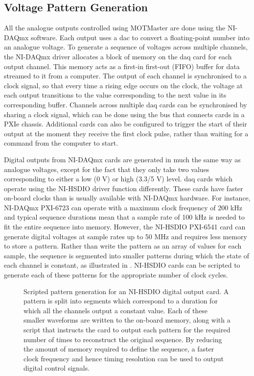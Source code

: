 \subsection{Voltage Pattern Generation}\label{subsec:compinterface_patterngen}
All the analogue outputs controlled using MOTMaster are done using the NI-DAQmx software. Each output uses a \ac{dac} to convert a floating-point number into an analogue voltage. To generate a sequence of voltages across multiple channels, the NI-DAQmx driver allocates a block of memory on the \ac{daq} card for each output channel. This memory acts as a first-in first-out (FIFO) buffer for data streamed to it from a computer. The output of each channel is synchronised to a clock signal, so that every time a rising edge occurs on the clock, the voltage at each output transitions to the value corresponding to the next value in its corresponding buffer. Channels across multiple \ac{daq} cards can be synchronised by sharing a clock signal, which can be done using the bus that connects cards in a PXIe chassis. Additional cards can also be configured to trigger the start of their output at the moment they receive the first clock pulse, rather than waiting for a command from the computer to start. \par\noindent 
Digital outputs from NI-DAQmx cards are generated in much the same way as analogue voltages, except for the fact that they only take two values corresponding to either a low (0 V) or high (3.3/5 V) level. \ac{daq} cards which operate using the NI-HSDIO driver function differently. These cards have faster on-board clocks than is usually available with NI-DAQmx hardware. For instance, NI-DAQmx PXI-6723 can operate with a maximum clock frequency of 200 kHz and typical sequence durations mean that a sample rate of 100 kHz is needed to fit the entire sequence into memory. However, the NI-HSDIO PXI-6541 card can generate digital voltages at sample rates up to 50 MHz and requires less memory to store a pattern. Rather than write the pattern as an array of values for each sample, the sequence is segmented into smaller patterns during which the state of each channel is constant, as illustrated in . NI-HSDIO cards can be scripted to generate each of these patterns for the appropriate number of clock cycles.
\begin{figure}
    \centering
    \caption[Scripted pattern generation for an NI-HSDIO card]{Scripted pattern generation for an NI-HSDIO digital output card. A pattern is split into segments which correspond to a duration for which all the channels output a constant value. Each of these smaller waveforms are written to the on-board memory, along with a script that instructs the card to output each pattern for the required number of times to reconstruct the original sequence. By reducing the amount of memory required to define the sequence, a faster clock frequency and hence timing resolution can be used to output digital control signals.}
    \label{fig:hsdio_timing}
\end{figure}

